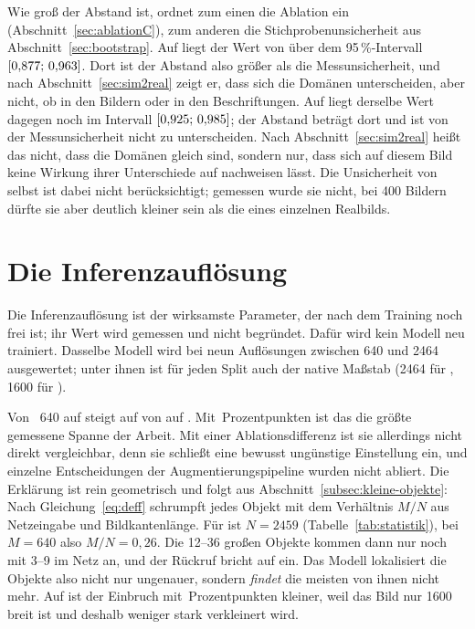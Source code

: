 Wie groß der Abstand ist, ordnet zum einen die Ablation ein
(Abschnitt~\ref{sec:ablationC}), zum anderen die Stichprobenunsicherheit aus
Abschnitt~\ref{sec:bootstrap}. Auf  liegt der Wert \zrefSvalMap{}
von  über dem 95\,\%-Intervall $[0{,}877;\,0{,}963]$. Dort
ist der Abstand also größer als die Messunsicherheit, und nach
Abschnitt~\ref{sec:sim2real} zeigt er, dass sich die Domänen unterscheiden,
aber nicht, ob in den Bildern oder in den Beschriftungen. Auf  liegt
derselbe Wert dagegen noch im Intervall $[0{,}925;\,0{,}985]$; der
Abstand beträgt dort \zsimRealTest\PP{} und ist von der Messunsicherheit nicht
zu unterscheiden. Nach Abschnitt~\ref{sec:sim2real} heißt das nicht, dass die
Domänen gleich sind, sondern nur, dass sich auf diesem Bild keine Wirkung
ihrer Unterschiede auf \mAPfifty{} nachweisen lässt. Die Unsicherheit von
 selbst ist dabei nicht berücksichtigt; gemessen wurde sie nicht,
bei 400 Bildern dürfte sie aber deutlich kleiner sein als die eines einzelnen
Realbilds.

\section{Die Inferenzauflösung}
\label{sec:imgsz}

Die Inferenzauflösung ist der wirksamste Parameter, der nach dem Training noch
frei ist; ihr Wert wird gemessen und nicht begründet. Dafür wird kein Modell neu
trainiert. Dasselbe Modell wird bei neun Auflösungen zwischen 640 und
2464\px{} ausgewertet; unter ihnen ist für jeden Split auch der native Maßstab
(2464 für , 1600 für ).


Von ~640 auf \zswValBestAt{} steigt \mAPfifty{} auf  von
\zswValNiedrig{} auf \zswValBest. Mit \zswValGain\,Prozentpunkten ist das die
größte gemessene Spanne der Arbeit. Mit einer Ablationsdifferenz ist sie
allerdings nicht direkt vergleichbar, denn sie schließt eine bewusst ungünstige
Einstellung ein, und einzelne Entscheidungen der Augmentierungspipeline wurden
nicht abliert. Die Erklärung ist rein geometrisch und folgt aus
Abschnitt~\ref{subsec:kleine-objekte}: Nach Gleichung~\eqref{eq:deff} schrumpft
jedes Objekt mit dem Verhältnis $M/N$ aus Netzeingabe und Bildkantenlänge. Für
 ist $N = 2459$\px{} (Tabelle~\ref{tab:statistik}), bei $M = 640$ also
$M/N = 0{,}26$. Die 12--36\px{} großen Objekte kommen dann nur noch mit
3--9\px{} im Netz an, und der Rückruf bricht auf \zswValNiedrigRec{} ein. Das
Modell lokalisiert die Objekte also nicht nur ungenauer, sondern \emph{findet}
die meisten von ihnen nicht mehr. Auf  ist der Einbruch mit \zswTestGain\,Prozentpunkten kleiner,
weil das Bild nur 1600\px{} breit ist und deshalb weniger stark verkleinert
wird.

